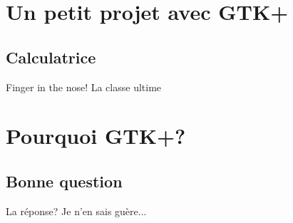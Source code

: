 \documentclass{beamer}
\begin{document}
\section{Un petit projet avec GTK+}
\subsection{Calculatrice}
\begin{frame}{Finger in the nose!}
La classe ultime
\end{frame}


\section{Pourquoi GTK+?}
\subsection{Bonne question}
\begin{frame}{La réponse?}
Je n'en sais guère...
\end{frame}
\end{document}
